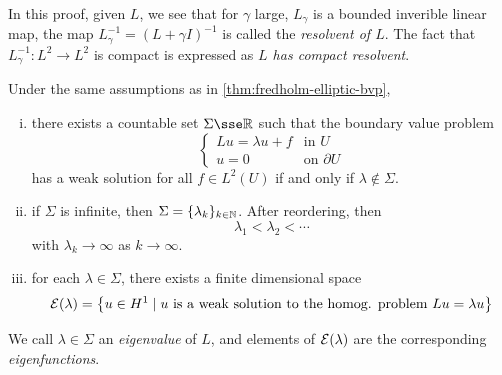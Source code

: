 \documentclass{article}
\begin{document}
\begin{remark}
    In this proof, given \(L\), we see that for \(\gamma\) large, \(L_\gamma\) is a bounded inverible linear map, the map \(L_\gamma^{-1} = (L + \gamma I)^{-1}\) is called the \emph{resolvent of \(L\)}. The fact that \(L_\gamma^{-1} : L^2 \to L^2\) is compact is expressed as \emph{\(L\) has compact resolvent}.
\end{remark}

\begin{theorem}
    Under the same assumptions as in \cref{thm:fredholm-elliptic-bvp},
    \begin{enumerate}[(i)]
        \item there exists a countable set \(\Sigma \sse \R\) such that the boundary value problem
        \begin{equation}
            \label{eq:elliptic-bvp-spectrum}
            \begin{cases}
                Lu = \lambda u + f &\text{in }U \\
                u = 0 & \text{on }\partial U
            \end{cases}
        \end{equation}
        has a weak solution for all \(f \in L^2(U)\) if and only if \(\lambda \notin \Sigma\).
        \item if \(\Sigma\) is infinite, then \(\Sigma = \{\lambda_k\}_{k \in \mathbb{N}}\). After reordering, then
        \[\lambda_1 < \lambda_2 < \cdots\]
        with \(\lambda_k \to \infty\) as \(k \to \infty\).
        \item for each \(\lambda \in \Sigma\), there exists a finite dimensional space
        \[\mathcal{E}(\lambda) = \left\{u \in H^1 \mid u \text{ is a weak solution to the homog. problem }Lu = \lambda u\right\}\]
    \end{enumerate}
    We call \(\lambda \in \Sigma\) an \emph{eigenvalue} of \(L\), and elements of \(\mathcal{E}(\lambda)\) are the corresponding \emph{eigenfunctions}.
\end{theorem}
\end{document}
